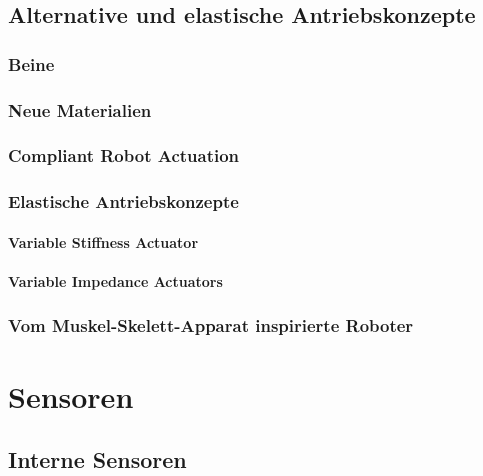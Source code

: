 \documentclass[a4paper, 11pt, accentcolor = tud3b]{tudreport}
\begin{document}
		\section{Alternative und elastische Antriebskonzepte} %

			\subsection{Beine} %

			\subsection{Neue Materialien} %

			\subsection{Compliant Robot Actuation} %

			\subsection{Elastische Antriebskonzepte} %

				\subsubsection{Variable Stiffness Actuator} %

				\subsubsection{Variable Impedance Actuators} %

			\subsection{Vom Muskel-Skelett-Apparat inspirierte Roboter} %

	\chapter{Sensoren} %

		\section{Interne Sensoren} %
\end{document}
